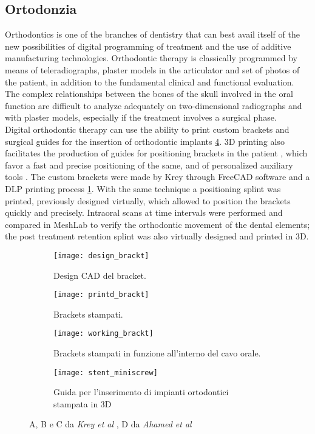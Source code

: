 \subsection{Ortodonzia} 
Orthodontics is one of the branches of dentistry that can best avail itself of the new possibilities of digital programming of treatment and the use of additive manufacturing technologies. Orthodontic therapy is classically programmed by means of teleradiographs, plaster models in the articulator and set of photos of the patient, in addition to the fundamental clinical and functional evaluation. The complex relationships between the bones of the skull involved in the oral function are difficult to analyze adequately on two-dimensional radiographs and with plaster models, especially if the treatment involves a surgical phase.\\
Digital orthodontic therapy can use the ability to print custom brackets \parencite{Reference115} and surgical guides for the insertion of orthodontic implants \parencite{Reference116} \ref{fig:stent_miniscrew}. 3D printing also facilitates the production of guides for positioning brackets in the patient \parencite{Reference127}, which favor a fast and precise positioning of the same, and of personalized auxiliary tools \parencite{Reference126}. The custom brackets were made by Krey through FreeCAD software and a DLP printing process \ref{fig:design_brackt}. With the same technique a positioning splint was printed, previously designed virtually, which allowed to position the brackets quickly and precisely. Intraoral scans at time intervals were performed and compared in MeshLab to verify the orthodontic movement of the dental elements; the post treatment retention splint was also virtually designed and printed in 3D. \\
\begin{figure}[h!]
 
\begin{subfigure}{0.5\textwidth}
\centering
\texttt{[image: design\_brackt]} 
\caption{Design CAD del bracket.}
\label{fig:design_brackt}
\end{subfigure}
\begin{subfigure}{0.5\textwidth}
\centering
\texttt{[image: printd\_brackt]}
\caption{Brackets stampati.}
\label{fig:printd_brackt}
\end{subfigure}
\begin{subfigure}{0.5\textwidth}
\centering
\texttt{[image: working\_brackt]}
\caption{Brackets stampati in funzione all'interno del cavo orale.}
\label{fig:working_brackt}
\end{subfigure}
\begin{subfigure}{0.5\textwidth}
\centering
\texttt{[image: stent\_miniscrew]}
\caption{Guida per l'inserimento di impianti ortodontici stampata in 3D}
\label{fig:stent_miniscrew}
\end{subfigure}
\caption{A, B e C da \emph{Krey et al} \parencite{Reference115}, D da \emph{Ahamed et al} \parencite{Reference116}}
\label{fig:3d_ortho}
\end{figure}

